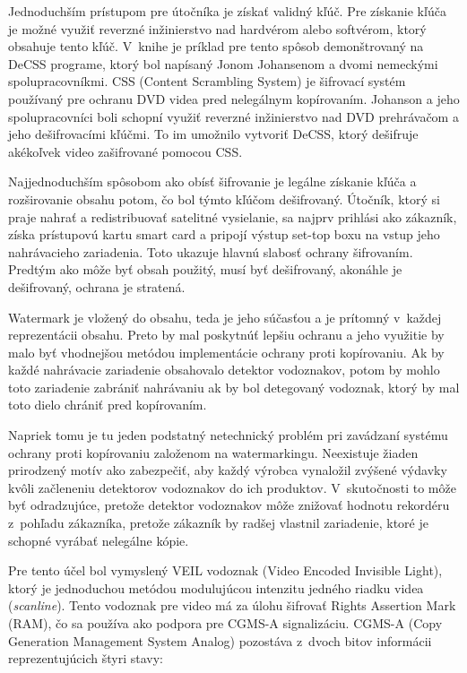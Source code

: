 Jednoduchším prístupom pre útočníka je získať validný kľúč. Pre získanie kľúča je možné využiť reverzné inžinierstvo nad hardvérom alebo softvérom, ktorý obsahuje tento kľúč. V~knihe \cite{Cox} je príklad pre tento spôsob demonštrovaný na DeCSS programe, ktorý bol napísaný Jonom Johansenom a dvomi nemeckými spolupracovníkmi.
CSS (Content Scrambling System) je šifrovací systém používaný pre ochranu DVD videa pred nelegálnym kopírovaním. Johanson a jeho spolupracovníci boli schopní využiť reverzné inžinierstvo nad DVD prehrávačom a jeho dešifrovacími kľúčmi. To im umožnilo vytvoriť DeCSS, ktorý dešifruje akékoľvek video zašifrované pomocou CSS.

Najjednoduchším spôsobom ako obísť šifrovanie je legálne získanie kľúča a rozširovanie obsahu potom, čo bol týmto kľúčom dešifrovaný. Útočník, ktorý si praje nahrať a redistribuovať satelitné vysielanie, sa najprv prihlási ako zákazník, získa prístupovú kartu smart card a pripojí výstup set-top boxu na vstup jeho nahrávacieho zariadenia. Toto ukazuje hlavnú slabosť ochrany šifrovaním. Predtým ako môže byť obsah použitý, musí byť dešifrovaný, akonáhle je dešifrovaný, ochrana je stratená.

Watermark je vložený do obsahu, teda je jeho súčasťou a je prítomný v~každej reprezentácii obsahu. Preto by mal poskytnúť lepšiu ochranu a jeho využitie by malo byť vhodnejšou metódou implementácie ochrany proti kopírovaniu. Ak by každé nahrávacie zariadenie obsahovalo detektor vodoznakov, potom by mohlo toto zariadenie zabrániť nahrávaniu ak by bol detegovaný vodoznak, ktorý by mal toto dielo chrániť pred kopírovaním.

Napriek tomu je tu jeden podstatný netechnický problém pri zavádzaní systému ochrany proti kopírovaniu založenom na watermarkingu. Neexistuje žiaden prirodzený motív ako zabezpečiť, aby každý výrobca vynaložil zvýšené výdavky kvôli začleneniu detektorov vodoznakov do ich produktov. V~skutočnosti to môže byť odradzujúce, pretože detektor vodoznakov môže znižovať hodnotu rekordéru z~pohľadu zákazníka, pretože zákazník by radšej vlastnil zariadenie, ktoré je schopné vyrábať nelegálne kópie.

Pre tento účel bol vymyslený VEIL vodoznak (Video Encoded Invisible Light), ktorý je jednoduchou metódou modulujúcou intenzitu jedného riadku videa ({\it scanline}). Tento vodoznak pre video má za úlohu šifrovať Rights Assertion Mark (RAM), čo sa používa ako podpora pre CGMS-A signalizáciu. CGMS-A (Copy Generation Management System Analog) pozostáva z~dvoch bitov informácii reprezentujúcich štyri stavy:

